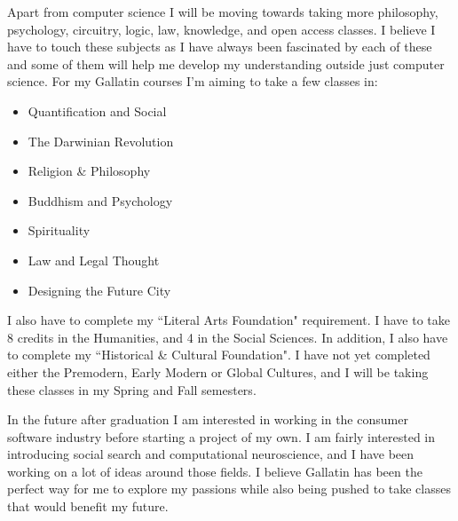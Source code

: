 \documentclass[11pt, oneside]{article}
\begin{document}
\par Apart from computer science I will be moving towards taking more philosophy, psychology, circuitry, logic, law, knowledge, and open access classes. I believe I have to touch these subjects as I have always been fascinated by each of these and some of them will help me develop my understanding outside just computer science. For my Gallatin courses I'm aiming to take a few classes in:

\begin{itemize}
\item Quantification and Social
\item The Darwinian Revolution
\item Religion \& Philosophy
\item Buddhism and Psychology
\item Spirituality
\item Law and Legal Thought
\item Designing the Future City
\end{itemize}

\par I also have to complete my ``Literal Arts Foundation" requirement. I have to take 8 credits in the Humanities, and 4 in the Social Sciences. In addition, I also have to complete my ``Historical \& Cultural Foundation". I have not yet completed either the Premodern, Early Modern or Global Cultures, and I will be taking these classes in my Spring and Fall semesters.

\par In the future after graduation I am interested in working in the consumer software industry before starting a project of my own. I am fairly interested in introducing social search and computational neuroscience, and I have been working on a lot of ideas around those fields. I believe Gallatin has been the perfect way for me to explore my passions while also being pushed to take classes that would benefit my future.
\end{document}
